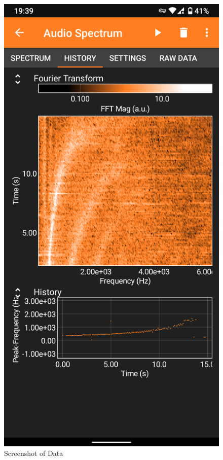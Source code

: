 \documentclass[12pt]{article}
\numberwithin{equation}{section}
\begin{document}
\begin{figure}[H]
	\centering
	\includegraphics[scale=0.2]{data-collection/screenshot.png}
	\caption{Screenshot of Data}
	\label{fig:screenshot}
\end{figure}
\end{document}
